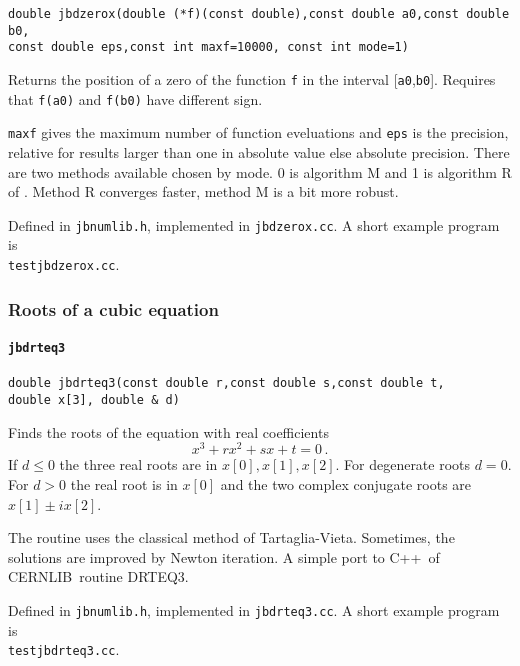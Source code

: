 \documentclass[12pt,a4paper]{article}
\newcommand{\mytt}[1]{\texttt{#1}}
\newcommand{\newfunction}[1]{\mytt{#1}\index{\mytt{#1}}}
\newcommand{\cernlib}{\textsc{CERNLIB}\cite{cernlib}}
\newcommand{\cpp}{\textsc{C++}}
\begin{document}
\mytt{double jbdzerox(double (*f)(const double),const double a0,const double b0,\\
\hspace*{2cm} const double eps,const int maxf=10000, const int mode=1)}

Returns the position of a zero of the function \mytt{f}
in the interval [\mytt{a0},\mytt{b0}]. Requires that \mytt{f(a0)}
and \mytt{f(b0)} have different sign.

\mytt{maxf} gives the maximum number of function eveluations
and \mytt{eps} is the precision, relative for results larger than one in
absolute value
else absolute precision.
There are two methods available chosen by mode. 0 is algorithm M
and 1 is algorithm R of \cite{BusDekker}. Method R converges faster,
method M is a bit more robust.

Defined in \mytt{jbnumlib.h}, implemented in \mytt{jbdzerox.cc}.
A short example program is\\\mytt{testjbdzerox.cc}.

\subsubsection{Roots of a cubic equation}

\paragraph{\newfunction{jbdrteq3}}

\mytt{double jbdrteq3(const double r,const double s,const double t,\\
\hspace*{2cm} double x[3],
double \& d)}

Finds the roots of the equation with real coefficients
\begin{equation}
x^3+r x^2+sx+t=0\,.
\end{equation}
If $d\le0$ the three real roots are in $x[0],x[1],x[2]$.
For degenerate roots $d=0$. For $d>0$ the real root is in $x[0]$
and the two complex conjugate roots are $x[1]\pm i x[2]$.

The routine uses the classical method of Tartaglia-Vieta.
Sometimes, the solutions are improved by Newton iteration. 
A simple port to \cpp\ of \cernlib\ routine DRTEQ3. 

Defined in \mytt{jbnumlib.h}, implemented in \mytt{jbdrteq3.cc}.
A short example program is\\\mytt{testjbdrteq3.cc}.

\end{document}
